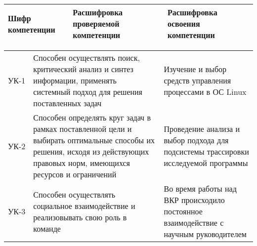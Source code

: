 {
\fontsize{12}{9}\selectfont
\noindent \begin{tabular}{|P{2.2cm}|P{6.5cm}|P{6.5cm}|}
	\hline
{\bfseries\centering Шифр компетенции} &
	{\bfseries Расшифровка проверяемой компетенции} &
	{\bfseries Расшифровка освоения компетенции} \\
	\hline
\end{tabular}%
\vspace*{-12pt}
\noindent \begin{longtable}[c]{|p{2.2cm}|p{6.5cm}|p{6.5cm}|}
\endfirsthead
\caption*{\raggedright\hspace{-10pt} Продолжение таблицы 1\vspace*{-35pt}}\\
\endhead
УК-1 &
Способен осуществлять поиск, критический анализ и синтез информации, применять системный подход для решения поставленных задач &
Изучение и выбор средств управления процессами в ОС Linux
\\ \hline

УК-2 &
Способен определять круг задач в рамках поставленной цели и выбирать оптимальные способы их решения, исходя из действующих правовых норм, имеющихся ресурсов и ограничений &
Проведение анализа и выбор подхода для подсистемы трассировки исследуемой программы
\\ \hline

УК-3 &
Способен осуществлять социальное взаимодействие и реализовывать свою роль в команде &
Во время работы над ВКР происходило постоянное взаимодействие с научным руководителем
\\ \hline


\end{longtable}}

